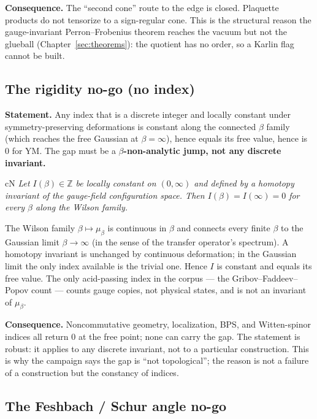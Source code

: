 \textbf{Consequence.} The ``second cone'' route to the edge is closed. Plaquette products do not
tensorize to a sign-regular cone. This is the structural reason the gauge-invariant
Perron--Frobenius theorem reaches the vacuum but not the glueball
(Chapter~\ref{sec:theorems}): the quotient has no order, so a Karlin flag cannot be built.

\subsection{The rigidity no-go (no index)}
\label{sec:rigidity}

\textbf{Statement.} Any index that is a discrete integer and locally constant under
symmetry-preserving deformations is constant along the connected $\beta$ family (which reaches
the free Gaussian at $\beta=\infty$), hence equals its free value, hence is $0$ for YM. The gap
must be a \textbf{$\beta$-non-analytic jump, not any discrete invariant.}

\begin{claimbox}{cN}
 \emph{Let $I(\beta)\in\mathbb Z$ be locally constant on
$(0,\infty)$ and defined by a homotopy invariant of the gauge-field configuration space. Then
$I(\beta)=I(\infty)=0$ for every $\beta$ along the Wilson family.}
\begin{proofx}
The Wilson family $\beta\mapsto\mu_\beta$ is continuous in $\beta$ and connects every finite
$\beta$ to the Gaussian limit $\beta\to\infty$ (in the sense of the transfer operator's
spectrum). A homotopy invariant is unchanged by continuous deformation; in the Gaussian limit the
only index available is the trivial one. Hence $I$ is constant and equals its free value. The
only acid-passing index in the corpus --- the Gribov--Faddeev--Popov count --- counts gauge
copies, not physical states, and is not an invariant of $\mu_\beta$.
\end{proofx}
\end{claimbox}

\textbf{Consequence.} Noncommutative geometry, localization, BPS, and Witten-spinor indices all
return $0$ at the free point; none can carry the gap. The statement is robust: it applies to any
discrete invariant, not to a particular construction. This is why the campaign says the gap is
``not topological''; the reason is not a failure of a construction but the constancy of indices.

\subsection{The Feshbach / Schur angle no-go}

